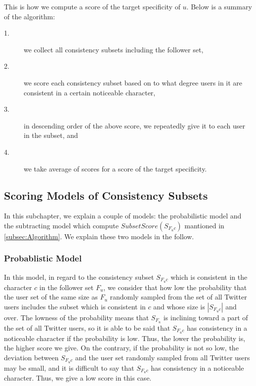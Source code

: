 This is how we compute a score of the target specificity of $u$.  Below
is a summary of the algorithm:

\begin{description}
\item[1.]  we collect all consistency subsets including the follower set,
\item[2.]  we score each consistency subset based on to what degree users
           in it are consistent in a certain noticeable character,
\item[3.]  in descending order of the above score, we repeatedly give it
           to each user in the subset, and
\item[4.]  we take average of scores for a score of the target
           specificity.
\end{description}

\subsection{Scoring Models of Consistency Subsets}
\label{subsec:Scoring}

In this subchapter, we explain a couple of models: the probabilistic
model and the subtracting model which compute
$\mathit{SubsetScore(S_{F_uc})}$ mantioned in \ref{subsec:Algorithm}.
We explain these two models in the follow.

\subsubsection{Probablistic Model}
\label{subsubsec:Probablistic}

In this model, in regard to the consistency subset $S_{F_uc}$ which is
consistent in the character $c$ in the follower set $F_u$, we consider
that how low the probability that the user set of the same size as $F_u$
randomly sampled from the set of all Twitter users includes the subset
which is consistent in $c$ and whose size is $|S_{F_uc}|$ and over.
The lowness of the probability means that $S_{F_u}$ is inclining toward
a part of the set of all Twitter users, so it is able to be said that
$S_{F_uc}$ has consistency in a noticeable character if the probability
is low.  Thus, the lower the probability is, the higher score we give.
On the contrary, if the probability is
not so low,  the deviation between $S_{F_uc}$ and the user set randomly
sampled from all Twitter users may be small, and it is difficult to say
that $S_{F_uc}$ has consistency in a noticeable character.  Thus, we
give a low score in this case.

